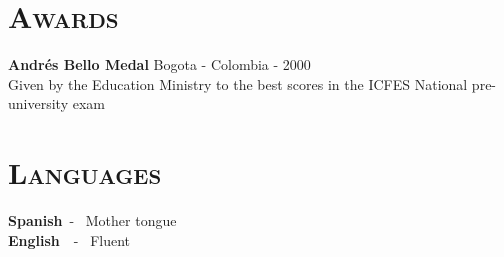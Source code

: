 \begin{resume}

\section{\textsc{Awards}}
\textbf{Andr\'{e}s Bello Medal} \hfill          Bogota - Colombia - 2000 \\
Given by the Education Ministry to the best scores in the ICFES National pre-university exam \hfill 

\section{\textsc{Languages}}
\textbf{Spanish}\   - \  Mother tongue \\
\textbf{English}\ \  - \ Fluent \\


\end{resume}
